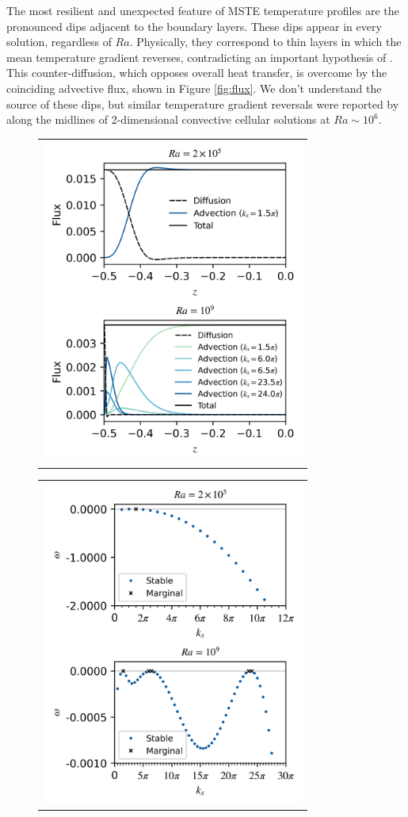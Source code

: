 \documentclass[reprint,amsmath,amssymb,aps]{revtex4-1}
\begin{document}
The most resilient and unexpected feature of MSTE temperature profiles are the pronounced dips adjacent to the boundary layers. 
These dips appear in every solution, regardless of $Ra$. 
Physically, they correspond to thin layers in which the mean temperature gradient reverses, contradicting an important hypothesis of \cite{Malkus_1954}. 
This counter-diffusion, which opposes overall heat transfer, is overcome by the coinciding advective flux, shown in Figure \ref{fig:flux}. 
We don't understand the source of these dips, but similar temperature gradient reversals were reported by \cite{chini_cells} along the midlines of 2-dimensional convective cellular solutions at $Ra \sim 10^6$. 


\begin{figure}
    \centering
    \begin{tabular}{@{}c@{}}
        \includegraphics[width=3.4in]{flux_sup_n.png}
    \end{tabular}
    \begin{tabular}{@{}c@{}}
        \includegraphics[width=3.4in]{EV_spectra_2ra.png}

\end{tabular}
\end{figure}
\end{document}
